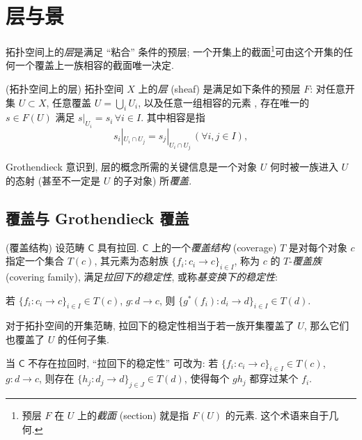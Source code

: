\section{层与景}

拓扑空间上的\emph{层}是满足 ``粘合'' 条件的预层; 一个开集上的截面\footnote{预层 $F$ 在 $U$ 上的\emph{截面} (section) 就是指 $F(U)$ 的元素. 这个术语来自于几何.}可由这个开集的任何一个覆盖上一族相容的截面唯一决定.

\begin{definition}
    {(拓扑空间上的层)}
    拓扑空间 $X$ 上的\emph{层} (sheaf) 是满足如下条件的预层 $F$:
    对任意开集 $U\subset X$, 任意覆盖 $U = \bigcup_i U_i$,
    以及任意一组相容的元素 ,
    存在唯一的 $s\in F(U)$
    满足 $s|_{U_i} = s_i\,\forall i\in I$.
    其中相容是指
    \begin{equation}
        s_i|_{U_i\cap U_j} = s_j|_{U_i\cap U_j}\,(\forall i,j \in I),
        \label{sheaf-condition}
    \end{equation}
\end{definition}

Grothendieck 意识到, 层的概念所需的关键信息是一个对象 $U$ 何时被一族进入 $U$ 的态射 (甚至不一定是 $U$ 的子对象) 所\emph{覆盖}.

\subsection{覆盖与 Grothendieck 覆盖}
\begin{definition}{(覆盖结构)}
    设范畴 $\mathsf C$ 具有拉回.
    $\mathsf C$ 上的一个\emph{覆盖结构} (coverage) $T$ 是对每个对象 $c$ 指定一个集合 $T(c)$, 其元素为态射族 $\{f_i \colon c_i \to c\}_{i\in I}$, 称为 $c$ 的 $T$-\emph{覆盖族} (covering family), 满足\emph{拉回下的稳定性}, 或称\emph{基变换下的稳定性}:
    \begin{center}
    	若 $\{f_i \colon c_i \to c\}_{i\in I}\in T(c)$, $g \colon d \to c$,
    	则 $\{g^*(f_i) \colon d_i \to d\}_{i\in I}\in T(d)$.
    \end{center}
    
    
\end{definition}

对于拓扑空间的开集范畴, 拉回下的稳定性相当于若一族开集覆盖了 $U$, 那么它们也覆盖了 $U$ 的任何子集.

\begin{remark}
    {}
    当 $\mathsf C$ 不存在拉回时, ``拉回下的稳定性'' 可改为: 若 $\{f_i \colon c_i \to c\}_{i\in I}\in T(c)$, $g \colon d \to c$,
    则存在 $\{h_j \colon d_j \to d\}_{j\in J}\in T(d)$,
    使得每个 $gh_j$ 都穿过某个 $f_i$.
\end{remark}

